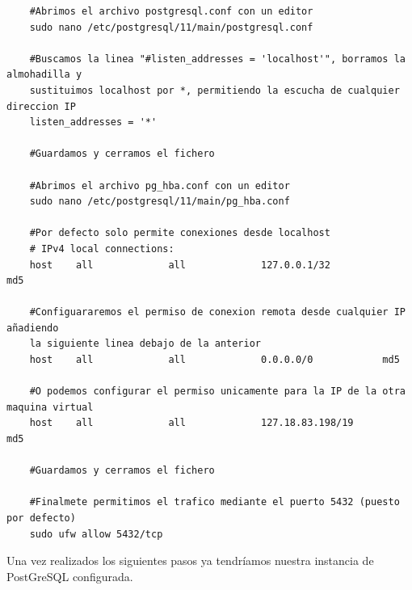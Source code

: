 \begin{verbatim}
	#Abrimos el archivo postgresql.conf con un editor
	sudo nano /etc/postgresql/11/main/postgresql.conf
	
	#Buscamos la linea "#listen_addresses = 'localhost'", borramos la almohadilla y
	sustituimos localhost por *, permitiendo la escucha de cualquier direccion IP
	listen_addresses = '*'
	
	#Guardamos y cerramos el fichero
	
	#Abrimos el archivo pg_hba.conf con un editor
	sudo nano /etc/postgresql/11/main/pg_hba.conf
	
	#Por defecto solo permite conexiones desde localhost
	# IPv4 local connections: 
	host    all             all             127.0.0.1/32            md5 
	
	#Configuararemos el permiso de conexion remota desde cualquier IP añadiendo
	la siguiente linea debajo de la anterior
	host    all             all             0.0.0.0/0            md5 
	
	#O podemos configurar el permiso unicamente para la IP de la otra maquina virtual
	host    all             all             127.18.83.198/19            md5 
	
	#Guardamos y cerramos el fichero
	
	#Finalmete permitimos el trafico mediante el puerto 5432 (puesto por defecto)
	sudo ufw allow 5432/tcp
\end{verbatim}

Una vez realizados los siguientes pasos ya tendríamos nuestra instancia de PostGreSQL configurada.
